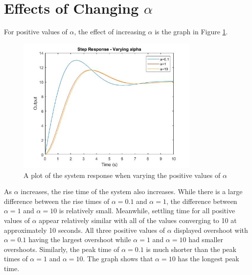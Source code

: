 \section{Effects of Changing $\alpha$}  %
For positive values of $\alpha$, the effect of increasing $\alpha$ is the graph in Figure \ref{fig:varying-alpha-positive}.
\begin{figure}[H]
	\centering
	\includegraphics[width=0.8\textwidth]{./figures/lab4_fig3-part4-3-2-positive.jpg}
	\caption{A plot of the system response when varying the positive values of $\alpha$}
	\label{fig:varying-alpha-positive}
\end{figure}
As $\alpha$ increases, the rise time of the system also increases. While there is a large difference between the rise times of $\alpha = 0.1$ and $\alpha = 1$, the difference between $\alpha = 1$ and $\alpha = 10$ is relatively small. Meanwhile, settling time for all positive values of $\alpha$ appear relatively similar with all of the values converging to 10 at approximately 10 seconds. All three positive values of $\alpha$ displayed overshoot with $\alpha = 0.1$ having the largest overshoot while $\alpha =1$ and $\alpha = 10$ had smaller overshoots. Similarly, the peak time of $\alpha = 0.1$ is much shorter than the peak times of $\alpha = 1$ and $\alpha = 10$. The graph shows that $\alpha = 10$ has the longest peak time. 

